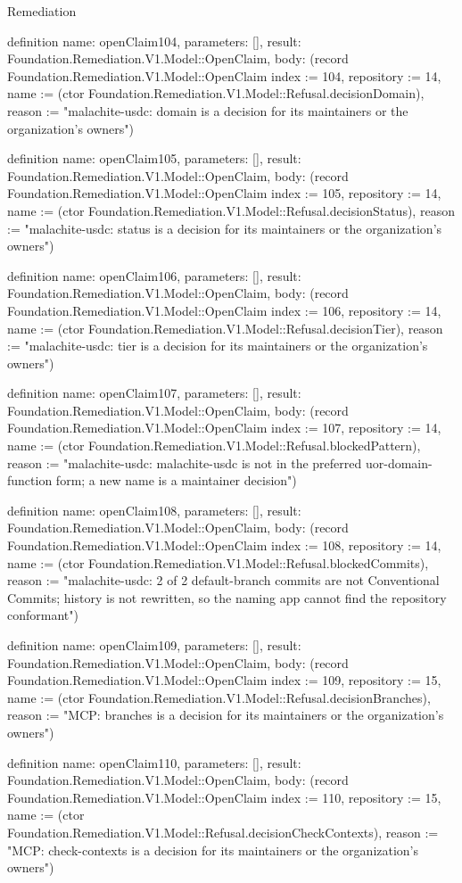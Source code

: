 \begin{lexlean}{Remediation}
\begin{semanticmodule}
definition{
  name: openClaim104,
  parameters: [],
  result: Foundation.Remediation.V1.Model::OpenClaim,
  body: (record Foundation.Remediation.V1.Model::OpenClaim {index := 104, repository := 14, name := (ctor Foundation.Remediation.V1.Model::Refusal.decisionDomain), reason := "malachite-usdc: domain is a decision for its maintainers or the organization's owners"})
}

definition{
  name: openClaim105,
  parameters: [],
  result: Foundation.Remediation.V1.Model::OpenClaim,
  body: (record Foundation.Remediation.V1.Model::OpenClaim {index := 105, repository := 14, name := (ctor Foundation.Remediation.V1.Model::Refusal.decisionStatus), reason := "malachite-usdc: status is a decision for its maintainers or the organization's owners"})
}

definition{
  name: openClaim106,
  parameters: [],
  result: Foundation.Remediation.V1.Model::OpenClaim,
  body: (record Foundation.Remediation.V1.Model::OpenClaim {index := 106, repository := 14, name := (ctor Foundation.Remediation.V1.Model::Refusal.decisionTier), reason := "malachite-usdc: tier is a decision for its maintainers or the organization's owners"})
}

definition{
  name: openClaim107,
  parameters: [],
  result: Foundation.Remediation.V1.Model::OpenClaim,
  body: (record Foundation.Remediation.V1.Model::OpenClaim {index := 107, repository := 14, name := (ctor Foundation.Remediation.V1.Model::Refusal.blockedPattern), reason := "malachite-usdc: malachite-usdc is not in the preferred uor-{domain}-{function} form; a new name is a maintainer decision"})
}

definition{
  name: openClaim108,
  parameters: [],
  result: Foundation.Remediation.V1.Model::OpenClaim,
  body: (record Foundation.Remediation.V1.Model::OpenClaim {index := 108, repository := 14, name := (ctor Foundation.Remediation.V1.Model::Refusal.blockedCommits), reason := "malachite-usdc: 2 of 2 default-branch commits are not Conventional Commits; history is not rewritten, so the naming app cannot find the repository conformant"})
}

definition{
  name: openClaim109,
  parameters: [],
  result: Foundation.Remediation.V1.Model::OpenClaim,
  body: (record Foundation.Remediation.V1.Model::OpenClaim {index := 109, repository := 15, name := (ctor Foundation.Remediation.V1.Model::Refusal.decisionBranches), reason := "MCP: branches is a decision for its maintainers or the organization's owners"})
}

definition{
  name: openClaim110,
  parameters: [],
  result: Foundation.Remediation.V1.Model::OpenClaim,
  body: (record Foundation.Remediation.V1.Model::OpenClaim {index := 110, repository := 15, name := (ctor Foundation.Remediation.V1.Model::Refusal.decisionCheckContexts), reason := "MCP: check-contexts is a decision for its maintainers or the organization's owners"})
}


\end{semanticmodule}
\end{lexlean}
